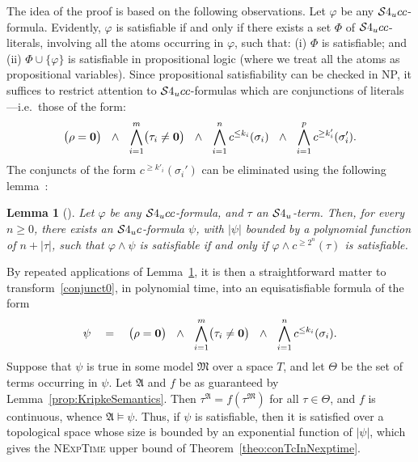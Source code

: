 \documentclass{LMCS}
\theoremstyle{plain}
\newtheorem{lemma}[thm]{Lemma}
\newcommand{\fA}{\mathfrak{A}}\newcommand{\fB}{\mathfrak{B}}\newcommand{\fM}{\mathfrak{M}}\newcommand{\cK}{\mathcal{K}}\newcommand{\R}{\mathbb{R}}\newcommand{\cR}{\mathcal{R}}\newcommand{\cL}{\mathcal{L}}\newcommand{\cLc}{\mathcal{L}c}\newcommand{\cLcc}{\mathcal{L}cc}
\newcommand{\NExpTime}{\textsc{NExpTime}}
\begin{document}
The idea of the proof is based on the following observations. Let
$\varphi$ be any $\mathcal{S}4_u{}cc$-formula. Evidently, $\varphi$ is satisfiable
if and only if there exists a set $\Phi$ of $\mathcal{S}4_u{}cc$-literals, involving
all the atoms occurring in $\varphi$, such that: (i) $\Phi$ is
satisfiable; and (ii) $\Phi \cup \{\varphi\}$ is satisfiable in
propositional logic (where we treat all the atoms as propositional variables). Since propositional satisfiability can be checked
in NP, it suffices to restrict
attention to $\mathcal{S}4_u{}cc$-formulas which are conjunctions of
literals---i.e.~those of the form:
\begin{align}
\label{conjunct0}
\bigl(\rho = \mathbf{0} \bigr) \ \ \land \
\ \bigwedge_{i = 1}^m \bigl( \tau_i \ne \mathbf{0} \bigr) \ \ \land \ \
\bigwedge_{i = 1}^n c^{\leq k_i}(\sigma_i) \ \ \land \ \
\bigwedge_{i = 1}^p c^{\geq k'_i}(\sigma_i').
\end{align}
The conjuncts of the form
$c^{\geq k'_i}(\sigma_i')$ can be eliminated using the following lemma~\cite{PrattHartmann02}:
\begin{lemma}[\cite{PrattHartmann02}]\label{lma:bigModels}
Let $\varphi$ be any $\mathcal{S}4_u{}cc$-formula, and $\tau$ an $\mathcal{S}4_u$-term.
Then, for every $n\ge 0$, there exists an $\mathcal{S}4_u{}c$-formula $\psi$, with $|\psi|$ bounded by a
polynomial function of $n+ |\tau|$, such that $\varphi \wedge \psi$
is satisfiable if and only if $\varphi \wedge c^{\geq 2^n}(\tau)$ is
satisfiable.
\end{lemma}

By repeated applications of Lemma~\ref{lma:bigModels}, it is then a
straightforward matter to transform~\eqref{conjunct0}, in polynomial
time, into an equisatisfiable formula of the form
\begin{align}
\label{conjunct1}
\psi \quad=\quad
\bigl(\rho = \mathbf{0} \bigr) \ \ \land \
\ \bigwedge_{i = 1}^m \bigl(\tau_i \ne \mathbf{0}\bigr) \ \ \land \ \
\bigwedge_{i = 1}^n c^{\leq k_i}(\sigma_i).
\end{align}
Suppose that $\psi$ is true in some model $\fM$ over a space $T$,
and let $\Theta$ be the set of terms occurring in $\psi$.  Let
$\fA$ and $f$ be as guaranteed by
Lemma~\ref{prop:KripkeSemantics}. Then $\tau^\mathfrak{A} =
f(\tau^\mathfrak{M})$ for all $\tau \in \Theta$, and $f$ is
continuous, whence $\fA \models \psi$.  Thus, if
$\psi$ is satisfiable, then it is satisfied over a topological space
whose size is bounded by an exponential function of $|\psi|$, which gives the \NExpTime{} upper bound of Theorem~\ref{theo:conTcInNexptime}.
\end{document}
